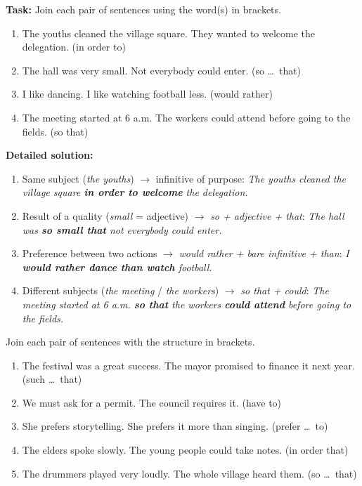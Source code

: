 \documentclass[11pt]{article}
\begin{document}
\begin{exoresolu}
\textbf{Task:} Join each pair of sentences using the word(s) in brackets.
\begin{enumerate}
\item The youths cleaned the village square. They wanted to welcome the delegation. (in order to)
\item The hall was very small. Not everybody could enter. (so \ldots\ that)
\item I like dancing. I like watching football less. (would rather)
\item The meeting started at 6 a.m. The workers could attend before going to the fields. (so that)
\end{enumerate}
\tcblower
\textbf{Detailed solution:}
\begin{enumerate}
\item Same subject (\emph{the youths}) $\rightarrow$ infinitive of purpose: \emph{The youths cleaned the village square \textbf{in order to welcome} the delegation.}
\item Result of a quality (\emph{small} = adjective) $\rightarrow$ \emph{so + adjective + that}: \emph{The hall was \textbf{so small that} not everybody could enter.}
\item Preference between two actions $\rightarrow$ \emph{would rather + bare infinitive + than}: \emph{I \textbf{would rather dance than watch} football.}
\item Different subjects (\emph{the meeting} / \emph{the workers}) $\rightarrow$ \emph{so that + could}: \emph{The meeting started at 6 a.m. \textbf{so that} the workers \textbf{could attend} before going to the fields.}
\end{enumerate}
\end{exoresolu}

\begin{exercice}
Join each pair of sentences with the structure in brackets.
\begin{enumerate}
\item The festival was a great success. The mayor promised to finance it next year. (such \ldots\ that)
\item We must ask for a permit. The council requires it. (have to)
\item She prefers storytelling. She prefers it more than singing. (prefer \ldots\ to)
\item The elders spoke slowly. The young people could take notes. (in order that)
\item The drummers played very loudly. The whole village heard them. (so \ldots\ that)
\end{enumerate}
\end{exercice}
\end{document}
